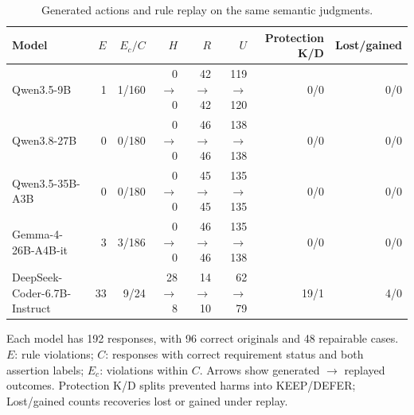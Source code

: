 \begin{table}[t]
\centering
\small
\caption{Generated actions and rule replay on the same semantic judgments.}
\label{tab:actions_full}
\begin{tabular}{lrrrrrrr}
\toprule
Model & $E$ & $E_c/C$ & $H$ & $R$ & $U$ & Protection K/D & Lost/gained \\
\midrule
Qwen3.5-9B & 1 & 1/160 & 0$\to$0 & 42$\to$42 & 119$\to$120 & 0/0 & 0/0 \\
Qwen3.8-27B & 0 & 0/180 & 0$\to$0 & 46$\to$46 & 138$\to$138 & 0/0 & 0/0 \\
Qwen3.5-35B-A3B & 0 & 0/180 & 0$\to$0 & 45$\to$45 & 135$\to$135 & 0/0 & 0/0 \\
Gemma-4-26B-A4B-it & 3 & 3/186 & 0$\to$0 & 46$\to$46 & 135$\to$138 & 0/0 & 0/0 \\
DeepSeek-Coder-6.7B-Instruct & 33 & 9/24 & 28$\to$8 & 14$\to$10 & 62$\to$79 & 19/1 & 4/0 \\
\bottomrule
\end{tabular}
\par\smallskip
\begin{minipage}{\linewidth}
\footnotesize
Each model has 192 responses, with 96 correct originals and 48 repairable cases. $E$: rule violations; $C$: responses with correct requirement status and both assertion labels; $E_c$: violations within $C$. Arrows show generated $\to$ replayed outcomes. Protection K/D splits prevented harms into KEEP/DEFER; Lost/gained counts recoveries lost or gained under replay.
\end{minipage}
\end{table}
